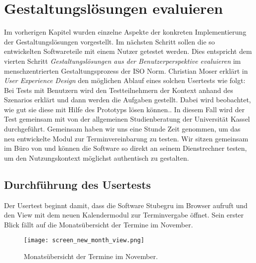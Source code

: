 \chapter{Gestaltungslösungen evaluieren}
\label{chapter:evaluation}

Im vorherigen Kapitel wurden einzelne Aspekte der konkreten Implementierung der
Gestaltungslösungen vorgestellt. Im nächsten Schritt sollen die so entwickelten
Softwareteile mit einem Nutzer getestet werden. Dies entspricht dem vierten
Schritt \textit{Gestaltungslösungen aus der Benutzerperspektive evaluieren} im
menschzentrierten Gestaltungsprozess der ISO Norm\cite{ISO9241}. Christian
Moser erklärt in \textit{User Experience Design} den möglichen Ablauf eines
solchen Usertests wie folgt: \glqq{}Bei Tests mit Benutzern wird den
Testteilnehmern der Kontext anhand des Szenarios erklärt und dann werden die
Aufgaben gestellt. Dabei wird beobachtet, wie gut sie diese mit Hilfe des
Prototyps lösen können.\grqq{}\cite{moserTesting}. In diesem Fall wird der Test
gemeinsam mit \ipName von der allgemeinen Studienberatung der Universität
Kassel durchgeführt. Gemeinsam haben wir uns eine Stunde Zeit genommen, um das
neu entwickelte Modul zur Terminvereinbarung zu testen. Wir sitzen gemeinsam im
Büro von \ipName und können die Software so direkt an seinem Dienstrechner
testen, um den Nutzungskontext möglichst authentisch zu gestalten.

\section{Durchführung des Usertests}

Der Usertest beginnt damit, dass \ipName die Software Stubegru im Browser
aufruft und den View mit dem neuen Kalendermodul zur Terminvergabe öffnet. Sein
erster Blick fällt auf die Monatsübersicht der Termine im November.

\begin{figure}[H]
    \caption{Monatsübersicht der Termine im November.}
    \centering
    \texttt{[image: screen\_new\_month\_view.png]}
\end{figure}

